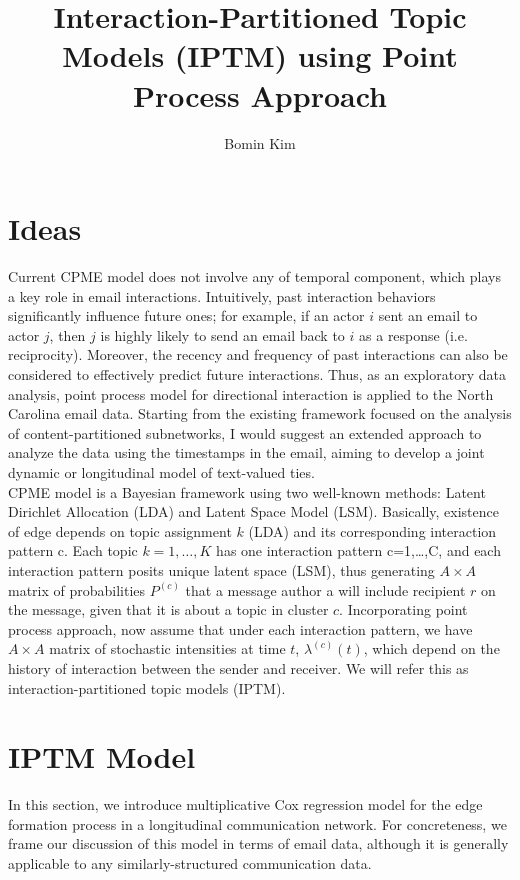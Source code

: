 \documentclass[a4paper]{article}
\title{Interaction-Partitioned Topic Models (IPTM) using Point Process Approach}
\author{Bomin Kim}
\begin{document}
\maketitle
\section{Ideas}
Current CPME model does not involve any of temporal component, which plays a key role in email interactions. Intuitively, past interaction behaviors significantly influence future ones; for example, if an actor $i$ sent an email to actor $j$, then $j$ is highly likely to send an email back to $i$ as a response (i.e. reciprocity). Moreover, the recency and frequency of past interactions can also be considered to effectively predict future interactions. Thus, as an exploratory data analysis, point process model for directional interaction is applied to the North Carolina email data. Starting from the existing framework focused on the analysis of content-partitioned subnetworks, I would suggest an extended approach to analyze the data using the timestamps in the email, aiming to develop a joint dynamic or longitudinal model of text-valued ties.\\ \newline
 CPME model is a Bayesian framework using two well-known methods: Latent Dirichlet Allocation (LDA) and Latent Space Model (LSM). Basically, existence of edge depends on topic assignment $k$ (LDA) and its corresponding interaction pattern c. Each topic $k=1,…,K$ has one interaction pattern c=1,…,C, and each interaction pattern posits unique latent space (LSM), thus generating $A\times A$ matrix of probabilities $P^{(c)}$ that a message author
a will include recipient $r$ on the message, given that it is about
a topic in cluster $c$.  Incorporating point process approach, now assume that under each interaction pattern, we have $A\times A$ matrix of stochastic intensities at time $t$, $\lambda^{(c)}(t)$, which depend on the history of interaction between the sender and receiver. We will refer this as  interaction-partitioned topic models (IPTM). 
\newpage
\section{IPTM Model}
In this section, we introduce multiplicative Cox regression model for the edge formation process in a longitudinal communication network. For concreteness, we frame our discussion of this model in terms of email data, although it is generally applicable to any similarly-structured communication data.
\end{document}
